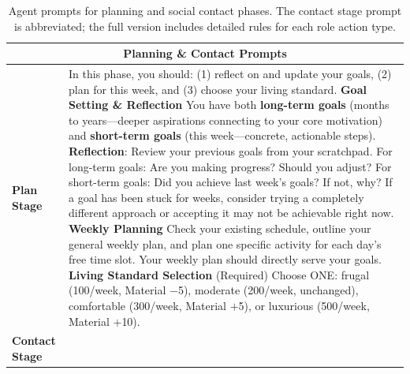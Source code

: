 \begin{table}[h]
\centering
\caption{Agent prompts for planning and social contact phases. The contact stage prompt is abbreviated; the full version includes detailed rules for each role action type.}
\label{tab:prompts_plan_contact}
\begin{tabular}{p{0.8in}p{4.3in}}
\toprule
\multicolumn{2}{c}{\textbf{Planning \& Contact Prompts}} \\
\midrule

\textbf{Plan Stage} &

In this phase, you should: (1) reflect on and update your goals, (2) plan for this week, and (3) choose your living standard.
\vspace{4pt}\newline
\textbf{Goal Setting \& Reflection}
\newline You have both \textbf{long-term goals} (months to years---deeper aspirations connecting to your core motivation) and \textbf{short-term goals} (this week---concrete, actionable steps).
\vspace{3pt}\newline
\textbf{Reflection}: Review your previous goals from your scratchpad. For long-term goals: Are you making progress? Should you adjust? For short-term goals: Did you achieve last week's goals? If not, why? If a goal has been stuck for weeks, consider trying a completely different approach or accepting it may not be achievable right now.
\vspace{4pt}\newline
\textbf{Weekly Planning}
\newline Check your existing schedule, outline your general weekly plan, and plan one specific activity for each day's free time slot. Your weekly plan should directly serve your goals.
\vspace{4pt}\newline
\textbf{Living Standard Selection} (Required)
\newline Choose ONE: frugal (100/week, Material $-$5), moderate (200/week, unchanged), comfortable (300/week, Material $+$5), or luxurious (500/week, Material $+$10).

\\
\midrule

\textbf{Contact Stage} &


\end{tabular}
\end{table}
